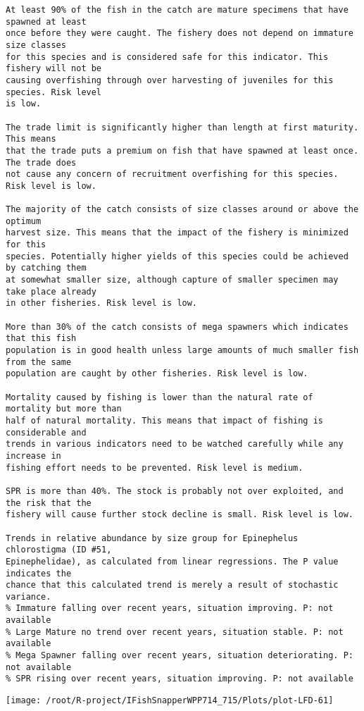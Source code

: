 \documentclass{report}\usepackage[]{graphicx}\usepackage[]{color}
\makeatletter
\def\maxwidth{ %
  \ifdim\Gin@nat@width>\linewidth
    \linewidth
  \else
    \Gin@nat@width
  \fi
}
\newenvironment{kframe}{%
 \def\at@end@of@kframe{}%
 \ifinner\ifhmode%
  \def\at@end@of@kframe{\end{minipage}}%
  \begin{minipage}{\columnwidth}%
 \fi\fi%
 \def\FrameCommand##1{\hskip\@totalleftmargin \hskip-\fboxsep
 \colorbox{shadecolor}{##1}\hskip-\fboxsep
     \hskip-\linewidth \hskip-\@totalleftmargin \hskip\columnwidth}%
 \MakeFramed {\advance\hsize-\width
   \@totalleftmargin\z@ \linewidth\hsize
   \@setminipage}}%
 {\par\unskip\endMakeFramed%
 \at@end@of@kframe}
\newenvironment{knitrout}{}{} %
\makeatother
\begin{document}
\begin{knitrout}
\begin{kframe}
\begin{verbatim}
At least 90% of the fish in the catch are mature specimens that have spawned at least
once before they were caught. The fishery does not depend on immature size classes
for this species and is considered safe for this indicator. This fishery will not be
causing overfishing through over harvesting of juveniles for this species. Risk level
is low.

The trade limit is significantly higher than length at first maturity.  This means
that the trade puts a premium on fish that have spawned at least once. The trade does
not cause any concern of recruitment overfishing for this species. Risk level is low.

The majority of the catch consists of size classes around or above the optimum
harvest size. This means that the impact of the fishery is minimized for this
species. Potentially higher yields of this species could be achieved by catching them
at somewhat smaller size, although capture of smaller specimen may take place already
in other fisheries. Risk level is low.

More than 30% of the catch consists of mega spawners which indicates that this fish
population is in good health unless large amounts of much smaller fish from the same
population are caught by other fisheries. Risk level is low.
 
Mortality caused by fishing is lower than the natural rate of mortality but more than
half of natural mortality. This means that impact of fishing is considerable and
trends in various indicators need to be watched carefully while any increase in
fishing effort needs to be prevented. Risk level is medium.
 
SPR is more than 40%. The stock is probably not over exploited, and the risk that the
fishery will cause further stock decline is small. Risk level is low.
 
Trends in relative abundance by size group for Epinephelus chlorostigma (ID #51,
Epinephelidae), as calculated from linear regressions. The P value indicates the
chance that this calculated trend is merely a result of stochastic variance.
% Immature falling over recent years, situation improving. P: not available
% Large Mature no trend over recent years, situation stable. P: not available
% Mega Spawner falling over recent years, situation deteriorating. P: not available
% SPR rising over recent years, situation improving. P: not available
\end{verbatim}
\end{kframe}
\texttt{[image: /root/R-project/IFishSnapperWPP714\_715/Plots/plot-LFD-61]} 


\end{knitrout}
\end{document}
